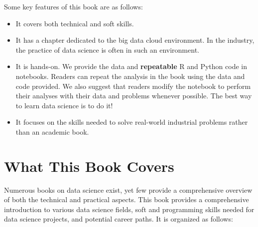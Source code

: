 \documentclass[
  12pt,
]{krantz}
\begin{document}
Some key features of this book are as follows:

\begin{itemize}
\item
  It covers both technical and soft skills.
\item
  It has a chapter dedicated to the big data cloud environment. In the industry, the practice of data science is often in such an environment.
\item
  It is hands-on. We provide the data and \textbf{repeatable} R and Python code in notebooks. Readers can repeat the analysis in the book using the data and code provided. We also suggest that readers modify the notebook to perform their analyses with their data and problems whenever possible. The best way to learn data science is to do it!
\item
  It focuses on the skills needed to solve real-world industrial problems rather than an academic book.
\end{itemize}

\hypertarget{what-this-book-covers}{%
\section*{What This Book Covers}\label{what-this-book-covers}}


Numerous books on data science exist, yet few provide a comprehensive overview of both the technical and practical aspects. This book provides a comprehensive introduction to various data science fields, soft and programming skills needed for data science projects, and potential career paths. It is organized as follows:
\end{document}
